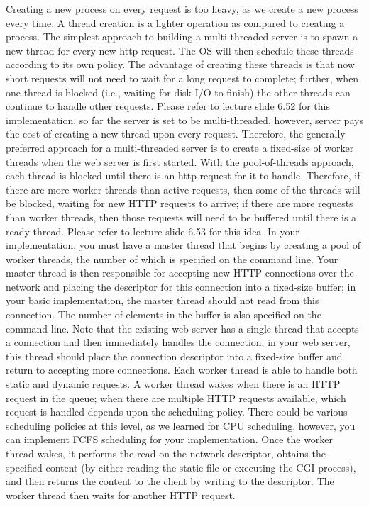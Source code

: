{}\markdownRendererInterblockSeparator
{}Creating a new process on every request is too heavy, as we create a new process every time. A thread creation is a lighter operation as compared to creating a process. The simplest approach to building a multi-threaded server is to spawn a new thread for every new http request. The OS will then schedule these threads according to its own policy. The advantage of creating these threads is that now short requests will not need to wait for a long request to complete; further, when one thread is blocked (i.e., waiting for disk I/O to finish) the other threads can continue to handle other requests. Please refer to lecture slide 6.52 for this implementation. \markdownRendererInterblockSeparator
{}\markdownRendererInterblockSeparator
{}so far the server is set to be multi-threaded, however, server pays the cost of creating a new thread upon every request. Therefore, the generally preferred approach for a multi-threaded server is to create a fixed-size  of worker threads when the web server is first started. With the pool-of-threads approach, each thread is blocked until there is an http request for it to handle. Therefore, if there are more worker threads than active requests, then some of the threads will be blocked, waiting for new HTTP requests to arrive; if there are more requests than worker threads, then those requests will need to be buffered until there is a ready thread. Please refer to lecture slide 6.53 for this idea.\markdownRendererInterblockSeparator
{}In your implementation, you must have a master thread that begins by creating a pool of worker threads, the number of which is specified on the command line. Your master thread is then responsible for accepting new HTTP connections over the network and placing the descriptor for this connection into a fixed-size buffer; in your basic implementation, the master thread should not read from this connection. The number of elements in the buffer is also specified on the command line. Note that the existing web server has a single thread that accepts a connection and then immediately handles the connection; in your web server, this thread should place the connection descriptor into a fixed-size buffer and return to accepting more connections.\markdownRendererInterblockSeparator
{}Each worker thread is able to handle both static and dynamic requests. A worker thread wakes when there is an HTTP request in the queue; when there are multiple HTTP requests available, which request is handled depends upon the scheduling policy. There could be various scheduling policies at this level, as we learned for CPU scheduling, however, you can implement FCFS scheduling for your implementation. Once the worker thread wakes, it performs the read on the network descriptor, obtains the specified content (by either reading the static file or executing the CGI process), and then returns the content to the client by writing to the descriptor. The worker thread then waits for another HTTP request.\markdownRendererInterblockSeparator
